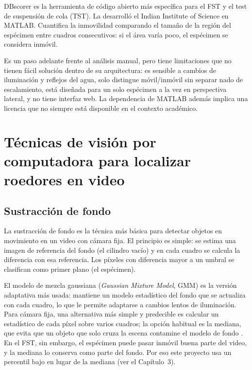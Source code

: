 DBscorer \cite{nandi2021_dbscorer} es la herramienta de código abierto más específica
para el FST y el test de suspensión de cola (TST). La desarrolló el Indian Institute of
Science en MATLAB. Cuantifica la inmovilidad comparando el tamaño de la región del
espécimen entre cuadros consecutivos: si el área varía poco, el espécimen se considera
inmóvil.

Es un paso adelante frente al análisis manual, pero tiene limitaciones que no tienen
fácil solución dentro de su arquitectura: es sensible a cambios de iluminación y
reflejos del agua, solo distingue móvil/inmóvil sin separar nado de escalamiento,
está diseñada para un solo espécimen a la vez en perspectiva lateral, y no tiene interfaz
web. La dependencia de MATLAB además implica una licencia que no siempre está
disponible en el contexto académico.

\section{Técnicas de visión por computadora para localizar roedores en video}

\subsection{Sustracción de fondo}

La sustracción de fondo es la técnica más básica para detectar objetos en movimiento
en un video con cámara fija. El principio es simple: se estima una imagen de referencia
del fondo (el cilindro vacío) y en cada cuadro se calcula la diferencia con esa
referencia. Los píxeles con diferencia mayor a un umbral se clasifican como primer plano
(el espécimen).

El modelo de mezcla gaussiana (\textit{Gaussian Mixture Model}, GMM) \cite{zivkovic2004} es
la versión adaptativa más usada: mantiene un modelo estadístico del fondo que se
actualiza con cada cuadro, lo que le permite adaptarse a cambios lentos de iluminación.
Para cámara fija, una alternativa más simple y predecible es calcular un estadístico
de cada píxel sobre varios cuadros; la opción habitual es la mediana, que evita que un
objeto que solo cruza la escena contamine el modelo de fondo \cite{piccardi2004}. En el
FST, sin embargo, el espécimen puede pasar inmóvil buena parte del video, y la mediana
lo conserva como parte del fondo. Por eso este proyecto usa un percentil bajo en lugar
de la mediana (ver el Capítulo~3).

